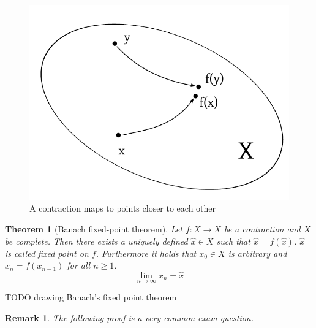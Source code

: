 \documentclass{article}
\newtheorem{theorem}{Theorem}  \numberwithin{theorem}{section}
\newtheorem{remark}{Remark}  \numberwithin{remark}{section}
\begin{document}
\begin{figure}
  \begin{center}
    \includegraphics{img/07_contraction.pdf}
    \caption{A contraction maps to points closer to each other}
    \label{img:contraction}
  \end{center}
\end{figure}

\begin{theorem}[Banach fixed-point theorem] %
  Let $f: X \to X$ be a contraction and $X$ be complete. Then there exists a uniquely defined $\hat{x} \in X$ such that $\hat{x} = f(\hat{x})$. $\hat{x}$ is called fixed point on $f$.
  Furthermore it holds that $x_0 \in X$ is arbitrary and $x_n = f(x_{n-1})$ for all $n \geq 1$.
  \[ \lim_{n \to \infty} x_n = \hat{x} \]
\end{theorem}

TODO drawing Banach's fixed point theorem

\begin{remark}
  The following proof is a very common exam question.
\end{remark}
\end{document}
